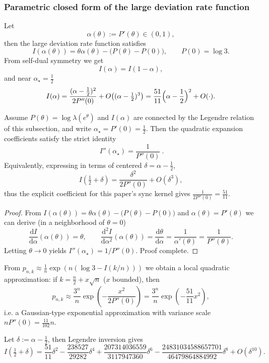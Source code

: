 \subsubsection{Parametric closed form of the large deviation rate function}\label{app:rate-param}
Let
\[
\alpha(\theta):=P'(\theta)\in(0,1),
\]
then the large deviation rate function satisfies
\[
I(\alpha(\theta))=\theta\alpha(\theta)-\bigl(P(\theta)-P(0)\bigr),\qquad P(0)=\log 3.
\]
From self-dual symmetry we get
\[
I(\alpha)=I(1-\alpha),
\]
and near $\alpha_\star=\frac12$
\[
I(\alpha)=\frac{(\alpha-\frac12)^2}{2P''(0)}+O\!\left((\alpha-\tfrac12)^3\right)
=\frac{51}{11}\Bigl(\alpha-\frac12\Bigr)^2+O(\cdot).
\]
\begin{proposition}\label{prop:einstein-legendre}
Assume \(P(\theta)=\log\lambda(e^\theta)\) and \(I(\alpha)\) are connected by the Legendre relation of this subsection, and write \(\alpha_\star=P'(0)=\tfrac12\).
Then the quadratic expansion coefficients satisfy the strict identity
\[
\boxed{\ I''(\alpha_\star)=\frac{1}{P''(0)}\ }.
\]
Equivalently, expressing in terms of centered \(\delta=\alpha-\tfrac12\),
\[
I\!\left(\tfrac12+\delta\right)=\frac{\delta^2}{2P''(0)}+O(\delta^3),
\]
thus the explicit coefficient for this paper's sync kernel gives \( \frac{1}{2P''(0)}=\frac{51}{11}\).
\end{proposition}
\begin{proof}
From \(I(\alpha(\theta))=\theta\alpha(\theta)-\bigl(P(\theta)-P(0)\bigr)\) and \(\alpha(\theta)=P'(\theta)\) we can derive (in a neighborhood of \(\theta=0\))
\[
\frac{\mathrm{d}I}{\mathrm{d}\alpha}(\alpha(\theta))=\theta,
\qquad
\frac{\mathrm{d}^2 I}{\mathrm{d}\alpha^2}(\alpha(\theta))=\frac{\mathrm{d}\theta}{\mathrm{d}\alpha}=\frac{1}{\alpha'(\theta)}=\frac{1}{P''(\theta)}.
\]
Letting \(\theta\to 0\) yields \(I''(\alpha_\star)=1/P''(0)\). Proof complete.
\end{proof}
From $p_{n,k}\approx \frac{1}{n}\exp(n(\log 3-I(k/n)))$ we obtain a local quadratic approximation: if
\(
k=\frac{n}{2}+x\sqrt{n}
\)
($x$ bounded), then
\[
p_{n,k}\approx \frac{3^n}{n}\exp\!\left(-\frac{x^2}{2P''(0)}\right)
=\frac{3^n}{n}\exp\!\left(-\frac{51}{11}x^2\right),
\]
i.e. a Gaussian-type exponential approximation with variance scale $nP''(0)=\frac{11}{102}n$.
\begin{corollary}\label{cor:moderate-deviation}
Let $\delta:=\alpha-\frac12$, then Legendre inversion gives
\[
I\!\left(\tfrac12+\delta\right)
=\frac{51}{11}\delta^2
-\frac{238527}{29282}\delta^4
+\frac{207314036559}{3117947360}\delta^6
-\frac{24831034588657701}{46479864884992}\delta^8
+O(\delta^{10}).
\]
\end{corollary}

